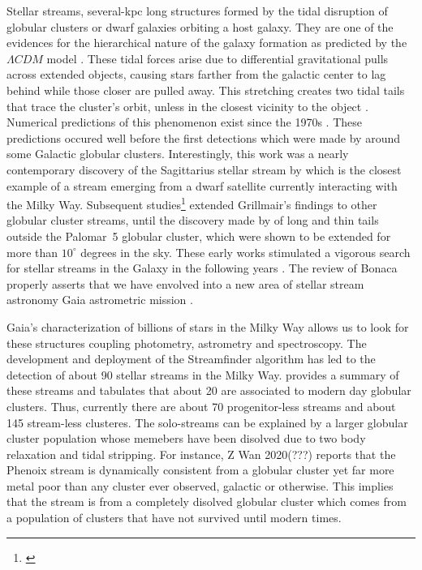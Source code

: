 \documentclass{aa}
\begin{document}
  Stellar streams, several-kpc long structures formed by the tidal disruption of globular clusters or dwarf galaxies orbiting a host galaxy. They are one of the evidences for the hierarchical nature of the galaxy formation as predicted by the $\Lambda CDM$ model \citep{white91}. These tidal forces arise due to differential gravitational pulls across extended objects, causing stars farther from the galactic center to lag behind while those closer are pulled away. This stretching creates two tidal tails that trace the cluster's orbit, unless in the closest vicinity to the object \citep{2007ApJ...659.1212M}. Numerical predictions of this phenomenon exist since the 1970s \citep[see, for example][]{1975AJ.....80..290K}. These predictions occured well before the first detections which were made by \citet{1995AJ....109.2553G} around some Galactic globular clusters. Interestingly, this work was a nearly contemporary discovery of the Sagittarius stellar stream by \citet{1994Natur.370..194I} which is the closest example of a stream emerging from a dwarf satellite currently interacting with the Milky Way. Subsequent studies\footnote{\citep[see][for more subsequent observation detections of tidal debris, i.e. globular cluster stars beyond the tidal radius.]{1997A&A...320..776L, 2000A&A...356..127T, 2000A&A...359..907L, 2001AAS...19910906S, 2003AJ....126..815L}} extended Grillmair's findings to other globular cluster streams, until the discovery made by \citet{2001ApJ...548L.165O,2002AAS...200.1001O, 2003AJ....126.2385O} of long and thin tails outside the Palomar~5 globular cluster, which were shown to be extended for more than $10^\circ$ degrees in the sky. These early works stimulated a vigorous search for stellar streams in the Galaxy in the following years \citep{2006ApJ...643L..17G, 2006ApJ...637L..29B, 2006ApJ...637L..29B, 2009ApJ...693.1118G}. The review of Bonaca properly asserts that we have envolved into a new area of stellar stream astronomy Gaia astrometric mission \citep{2016A&A...595A...1G}. 
  
  Gaia's characterization of billions of stars in the Milky Way allows us to look for these structures coupling photometry, astrometry and spectroscopy. The development and deployment of the Streamfinder algorithm has led to the detection of about 90 stellar streams in the Milky Way. \citet{2023MNRAS.520.5225M} provides a summary of these streams and tabulates that about 20 are associated to modern day globular clusters. Thus, currently there are about 70 progenitor-less streams and about 145 stream-less clusteres. The solo-streams can be explained by a larger globular cluster population whose memebers have been disolved due to two body relaxation and tidal stripping. For instance, Z Wan 2020(???) reports that the Phenoix stream is dynamically consistent from a globular cluster yet far more metal poor than any cluster ever observed, galactic or otherwise. This implies that the stream is from a completely disolved globular cluster which comes from a population of clusters that have not survived until modern times. 
  
\end{document}
